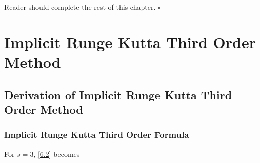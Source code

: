 \documentclass[a4paper,oneside]{book}
\numberwithin{equation}{chapter}
\begin{document}
Reader should complete the rest of this chapter.  \hfill $\square$




\chapter{Implicit Runge Kutta Third Order Method}
\section{Derivation of Implicit Runge Kutta Third Order Method}
\subsection{Implicit Runge Kutta Third Order Formula}
For $s=3$, \eqref{6.2} becomes
\end{document}
